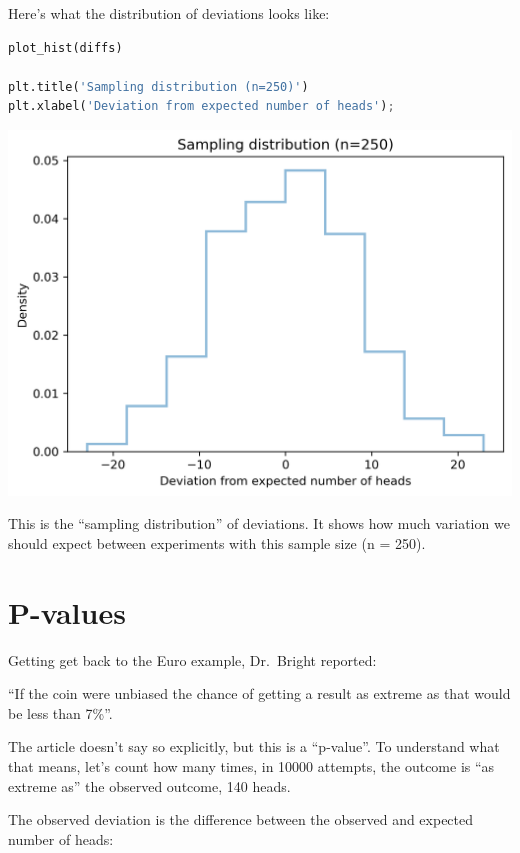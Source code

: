 Here's what the distribution of deviations looks like:

\begin{lstlisting}[language=Python,style=source]
plot_hist(diffs)

plt.title('Sampling distribution (n=250)')
plt.xlabel('Deviation from expected number of heads');
\end{lstlisting}

\begin{center}
\includegraphics[scale=0.75]{11_inference_files/11_inference_29_0.png}
\end{center}

This is the ``sampling distribution'' of deviations. It shows how much
variation we should expect between experiments with this sample size (n
= 250).

\hypertarget{p-values}{%
\section{P-values}\label{p-values}}

Getting get back to the Euro example, Dr.~Bright reported:

``If the coin were unbiased the chance of getting a result as extreme as
that would be less than 7\%''.

The article doesn't say so explicitly, but this is a ``p-value''. To
understand what that means, let's count how many times, in 10000
attempts, the outcome is ``as extreme as'' the observed outcome, 140
heads.

The observed deviation is the difference between the observed and
expected number of heads:

